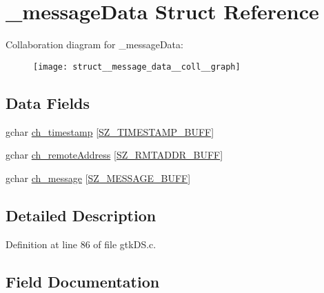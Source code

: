 \hypertarget{struct__message_data}{}\section{\+\_\+message\+Data Struct Reference}
\label{struct__message_data}


Collaboration diagram for \+\_\+message\+Data\+:
\nopagebreak
\begin{figure}[H]
\begin{center}
\leavevmode
\texttt{[image: struct\_\_message\_data\_\_coll\_\_graph]}
\end{center}
\end{figure}
\subsection*{Data Fields}
\begin{DoxyCompactItemize}
\item 
gchar \hyperlink{struct__message_data_a34854aba2033bcf0a48c1915b84452bf}{ch\+\_\+timestamp} \mbox{[}\hyperlink{gtk_d_s_8c_ac08ad1b127f1c9743c5592ffb796423f}{S\+Z\+\_\+\+T\+I\+M\+E\+S\+T\+A\+M\+P\+\_\+\+B\+U\+F\+F}\mbox{]}
\item 
gchar \hyperlink{struct__message_data_ad7d54fd9c1f9c0f8f6592ba194d6106f}{ch\+\_\+remote\+Address} \mbox{[}\hyperlink{gtk_d_s_8c_a152ca8fa1a2eac39d1badafb6c6cef8c}{S\+Z\+\_\+\+R\+M\+T\+A\+D\+D\+R\+\_\+\+B\+U\+F\+F}\mbox{]}
\item 
gchar \hyperlink{struct__message_data_a26366c3de6b85c0312117e42a46093e8}{ch\+\_\+message} \mbox{[}\hyperlink{gtk_d_s_8c_ab5903aa853c3769389e570c8490feb1e}{S\+Z\+\_\+\+M\+E\+S\+S\+A\+G\+E\+\_\+\+B\+U\+F\+F}\mbox{]}
\end{DoxyCompactItemize}


\subsection{Detailed Description}


Definition at line 86 of file gtk\+D\+S.\+c.



\subsection{Field Documentation}
\hypertarget{struct__message_data_a26366c3de6b85c0312117e42a46093e8}{}
